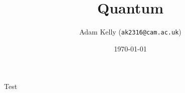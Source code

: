 \documentclass[a4paper]{scrartcl}
\title{Quantum}
\author{Adam Kelly (\texttt{ak2316@cam.ac.uk})}
\date{\today}
\begin{document}
\maketitle












Test
\end{document}
